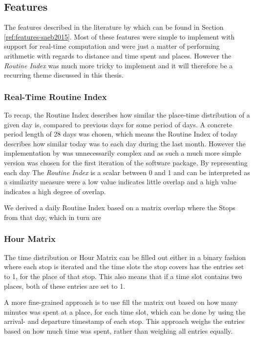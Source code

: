 \subsection{Features}
The features described in the literature by \cite{Saeb2015} which can be found in Section \ref{ref:features-saeb2015}. Most of these features were simple to implement with support for real-time computation and were just a matter of performing arithmetic with regards to distance and time spent and places. However the \textit{Routine Index} \cite{Saeb2015, Canzian2015} was much more tricky to implement and it will therefore be a recurring theme discussed in this thesis.

\subsubsection*{Real-Time Routine Index}
To recap, the Routine Index describes how similar the place-time distribution of a given day is, compared to previous days for some period of days. A concrete period length of 28 days was chosen, which means the Routine Index of today describes how similar today was to each day during the last month. However the implementation by \cite{Canzian2015} was unnecessarily complex and as such a much more simple version was chosen for the first iteration of the software package. By representing each day 
The \textit{Routine Index} is a scalar between 0 and 1 and can be interpreted as a similarity measure were a low value indicates little overlap and a high value indicates a high degree of overlap. 

We derived a daily Routine Index based on a matrix overlap where the Stops from that day, which in turn are 

\subsubsection*{Hour Matrix}
The time distribution or Hour Matrix can be filled out either in a binary fashion where each stop is iterated and the time slots the stop covers has the entries set to 1, for the place of that stop. This also means that if a time slot contains two places, both of these entries are set to 1.

A more fine-grained approach is to use fill the matrix out based on how many minutes was spent at a place, for each time slot, which can be done by using the arrival- and departure timestamp of each stop. This approach weighs the entries based on how much time was spent, rather than weighing all entries equally.

